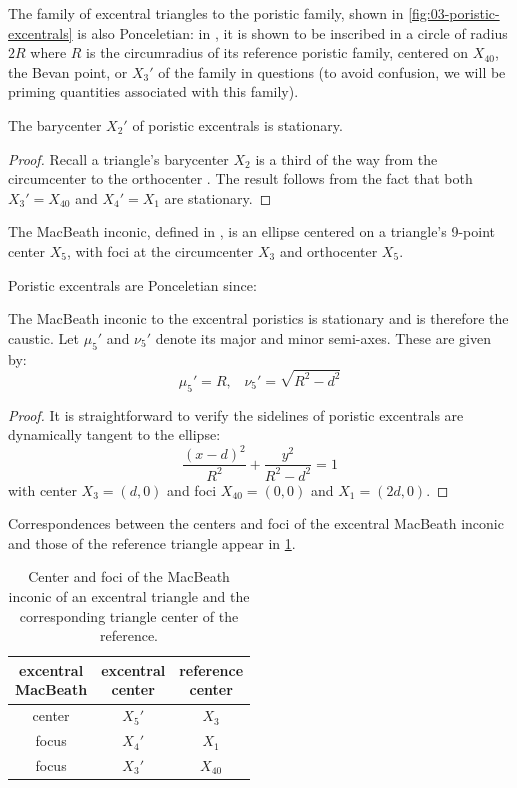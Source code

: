 The family of excentral triangles to the poristic family, shown in \cref{fig:03-poristic-excentrals} is also Ponceletian: in \cite{odehnal2011-poristic}, it is shown to be inscribed in a circle of radius $2R$ where $R$ is the circumradius of its reference poristic family, centered on $X_{40}$, the Bevan point, or $X_3'$ of the family in questions (to avoid confusion, we will be priming quantities associated with this family).

\begin{proposition}
The barycenter $X_2'$ of poristic excentrals is stationary.
\end{proposition}

\begin{proof}
Recall a triangle's barycenter $X_2$ is a third of the way from the circumcenter to the orthocenter \cite[Euler Line, Eqn. 6]{mw}. The result follows from the fact that both $X_3'=X_{40}$ and $X_4'=X_1$ are stationary.
\end{proof}

The MacBeath inconic, defined in \cite[MacBeath Inconic]{mw}, is an ellipse centered on a triangle's 9-point center $X_5$, with  foci at the circumcenter $X_3$ and orthocenter $X_5$.

Poristic excentrals are Ponceletian since:

\begin{proposition}
The MacBeath inconic to the excentral poristics is stationary and is therefore the caustic. Let $\mu_5'$ and $\nu_5'$ denote its major and minor semi-axes. These are given by:
\[ \mu_5'=R,\;\;\;\nu_5'=\sqrt{R^2-d^2} \]
\end{proposition}

\begin{proof}
It is straightforward to verify the sidelines of poristic excentrals are dynamically  tangent to the ellipse:
\[
\frac{(x-d)^2}{R^2}+\frac{y^2}{R^2-d^2}=1\]
with center $X_3=(d,0)$ and foci $X_{40}=(0,0)$ and $X_1=(2d,0)$.
\end{proof}

Correspondences between the centers and foci of the excentral MacBeath inconic and those of the reference triangle appear in \cref{tab:03-macbeath}.

\begin{table}
\centering
\begin{tabular}{|c|c|c|}
\hline
\makecell[cc]{excentral\\ MacBeath} &
\makecell[cc]{excentral\\center} &
\makecell[cc]{reference\\center} \\
\hline
center & $X_5'$ & $X_3$\\
focus & $X_4'$ & $X_1$  \\
focus & $X_3'$ & $X_{40}$ \\
\hline
\end{tabular}
\caption{Center and foci of the MacBeath inconic of an excentral triangle and the corresponding triangle center of the reference.} 
\label{tab:03-macbeath}
\end{table}

